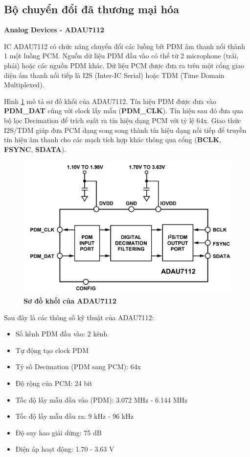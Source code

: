 \subsection{Bộ chuyển đổi đã thương mại hóa}
\noindent\textbf{Analog Devices - ADAU7112} \label{adauref}

IC ADAU7112 có chức năng chuyển đổi các luồng bít PDM âm thanh nổi thành 1 một luồng PCM. Nguồn dữ liệu PDM đầu vào có thể từ 2 microphone (trái, phải) hoặc các nguồn PDM khác. Dữ liệu PCM được đưa ra trên một cổng giao diện âm thanh nối tiếp là I2S (Inter-IC Serial) hoặc TDM (Time Domain Multiplexed). \cite{adau7112}

Hình \ref{adau7112_f} mô tả sơ đồ khối của ADAU7112. Tín hiệu PDM được đưa vào \textbf{PDM\_DAT} cũng với clock lấy mẫu (\textbf{PDM\_CLK}). Tín hiệu sau đó đưa qua bộ lọc Decimation để trích suất ra tín hiệu dạng PCM với tỷ lệ 64x. Giao thức I2S/TDM giúp đưa PCM dạng song song thành tín hiệu dạng nối tiếp để truyền tín hiệu âm thanh cho các mạch tích hợp khác thông qua cổng (\textbf{BCLK}, \textbf{FSYNC}, \textbf{SDATA}).

\begin{figure}[H]
    \centering
    \includegraphics[width=12cm]{Images/Chuong3/MoDau/adau7112.png}
    \caption[Sơ đồ tổng quát của bộ chuyển đổi]{\bfseries \fontsize{12pt}{0pt}\selectfont Sơ đồ khối của ADAU7112}
    \label{adau7112_f}
\end{figure}

Sau đây là các thông số kỹ thuật của ADAU7112:
\begin{itemize}
    \item Số kênh PDM đầu vào: 2 kênh
    \item Tự động tạo clock PDM
    \item Tỷ số Decimation (PDM sang PCM): 64x
    \item Độ rộng của PCM: 24 bit
    \item Tốc độ lấy mẫu đầu vào (PDM): 3.072 MHz - 6.144 MHz
    \item Tốc độ lấy mẫu đầu ra: 9 kHz - 96 kHz
    \item Độ suy hao giải dừng: 75 dB
    \item Điện áp hoạt động: 1.70 - 3.63 V
\end{itemize}
